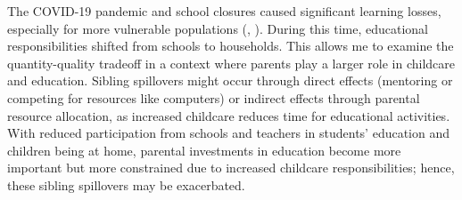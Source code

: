 




The COVID-19 pandemic and school closures caused significant learning losses, especially for more vulnerable populations (\cite{haelermans_inequality_2022}, \cite{jakubowski_global_2023}). During this time, educational responsibilities shifted from schools to households. This allows me to examine the quantity-quality tradeoff in a context where parents play a larger role in childcare and education. Sibling spillovers might occur through direct effects (mentoring or competing for resources like computers) or indirect effects through parental resource allocation, as increased childcare reduces time for educational activities. With reduced participation from schools and teachers in students’ education and children being at home, parental investments in education become more important but more constrained due to increased childcare responsibilities; hence, these sibling spillovers may be exacerbated. 

